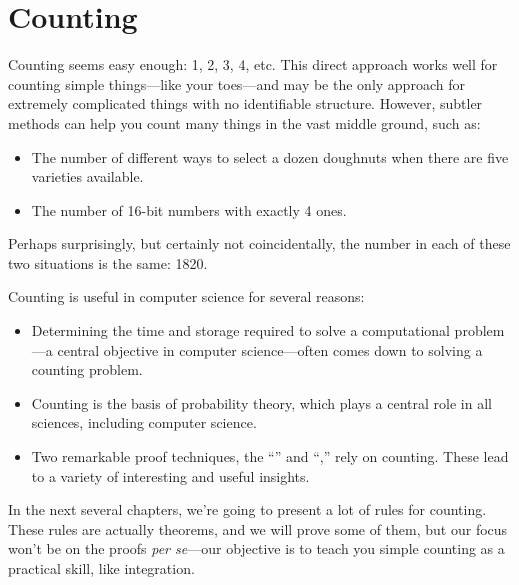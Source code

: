 \part{Counting}
\label{part:counting}

\partintro

Counting seems easy enough: 1, 2, 3, 4, etc.  This direct approach
works well for counting simple things---like your toes---and may be
the only approach for extremely complicated things with no
identifiable structure.  However, subtler methods can help you count
many things in the vast middle ground, such as:
\begin{itemize}

\item The number of different ways to select a dozen doughnuts when
there are five varieties available.

\item The number of 16-bit numbers with exactly 4 ones.

\end{itemize}
Perhaps surprisingly, but certainly not coincidentally, the number in
each of these two situations is the same: 1820.

Counting is useful in computer science for several reasons:
\begin{itemize}

\item

Determining the time and storage required to solve a computational
problem---a central objective in computer science---often comes down
to solving a counting problem.

\item

Counting is the basis of probability theory, which plays a central
role in all sciences, including computer science.

\item

Two remarkable proof techniques, the ``''
and ``,'' rely on counting.  These lead to a
variety of interesting and useful insights.

\end{itemize}

In the next several chapters, we're going to present a lot of rules
for counting.  These rules are actually theorems, and we will prove
some of them, but our focus won't be on the proofs \emph{per se}---our
objective is to teach you simple counting as a practical skill, like
integration.

